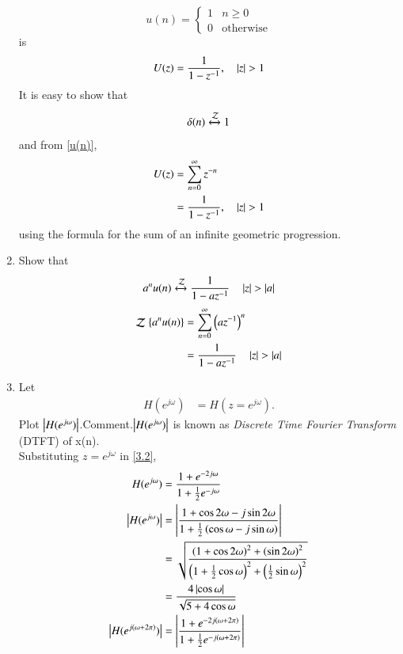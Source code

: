 \documentclass[journal,12pt,twocolumn]{IEEEtran}
\newcommand{\systemZ}[1]{\stackrel{#1}{\mathcal{Z}}}
\theoremstyle{remark}
\begin{document}
\begin{enumerate}[label=\thesection.\arabic*]
\begin{equation}
\label{u(n)}
u(n)
=
\begin{cases}
1 & n \ge 0
\\
0 & \text{otherwise}
\end{cases}
\end{equation}
is
\begin{equation}
U(z) = \frac{1}{1-z^{-1}}, \quad \left\vert z\right\vert > 1
\end{equation}
\solution It is easy to show that
\begin{equation}
\delta(n) \xleftrightarrow{\systemZ{}} 1
\end{equation}
and from \eqref{u(n)},
\begin{align}
U(z) &= \sum _{n= 0}^{\infty}z^{-n} \\
&=\frac{1}{1-z^{-1}}, \quad \left\vert z\right\vert > 1
\end{align}
using the formula for the sum of an infinite geometric progression.
\item Show that 
\begin{equation}
\label{eq:anun}
a^nu(n) \xleftrightarrow{\systemZ{}}\frac{1}{1-az^{-1}} \quad \abs{z} > \abs{a}
\end{equation}
\solution 
\begin{align}
	\systemZ{}\cbrak{a^nu(n)}&= \sum_{n = 0}^{\infty}\brak{az^{-1}}^n \\
			&= \frac{1}{1-az^{-1}} \quad \abs{z} > \abs{a} \label{3.4}
\end{align}
\item Let
\begin{align}
H(e^{j\omega})&=H(z=e^{j\omega}).
\end{align}
Plot $\left\vert H(e^{j\omega})\right\vert$.Comment.$\left\vert H(e^{j\omega})\right\vert$ is known as \textit{Discrete Time Fourier Transform} (DTFT) of x(n).\\
\solution
Substituting $z=e^{j\omega}$ in \eqref{3.2},
\begin{align}
H(e^{j\omega})&=\frac{1+e^{-2j\omega}}{1+\frac{1}{2}e^{-j\omega}} \\
\abs{H(e^{j\omega})} &= \abs{\frac{1+\cos2\omega -j\sin 2\omega }{1+\frac{1}{2}\brak{\cos\omega-j\sin\omega}}} \\
&= \sqrt{\frac{\brak{1+\cos2\omega}^2+\brak{\sin 2\omega}^2}{\brak{1+\frac{1}{2}\cos\omega}^2+\brak{\frac{1}{2}\sin\omega}^2}}\\
&= \frac{4\abs{\cos\omega}}{\sqrt{5+4\cos\omega}}\\
\abs{H(e^{j(\omega+2\pi)})}&=\abs{\frac{1+e^{-2j(\omega+2\pi)}}{1+\frac{1}{2}e^{-j(\omega+2\pi)}}} \\

\end{align}
\end{enumerate}
\end{document}
